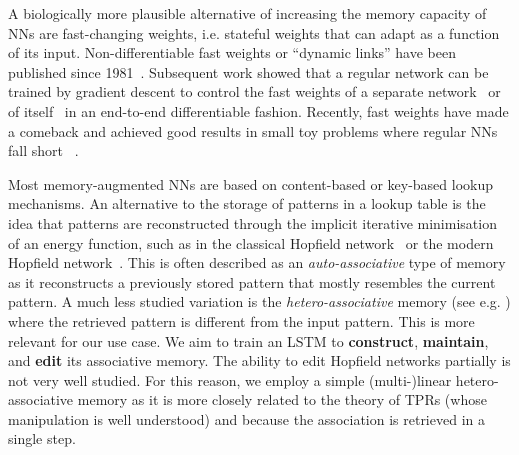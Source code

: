 \documentclass{article} \usepackage{iclr2021_conference,times}
\begin{document}
A biologically more plausible alternative of increasing the memory capacity of NNs are fast-changing weights, i.e. stateful weights that can adapt as a function of its input.
Non-differentiable fast weights or ``dynamic links'' have been published since 1981~\citep{von1981correlation,feldman1982dynamic,hinton1987deblur}.
Subsequent work showed that a regular network can be trained by gradient descent to control the fast weights of a separate network~\citep{Schmidhuber:92ncfastweights} or of itself~\citep{Schmidhuber:93ratioicann} in an end-to-end differentiable fashion.
Recently, fast weights have made a comeback and achieved good results in small toy problems where regular NNs fall short ~\citep{Ba2016using,schlag2017gated,munkhdalai2017meta,pritzel2017neural,ha2017hypernetworks,zhang2017learning,miconi2018differentiable,miconi2018backpropamine,schlag2018nips,munkhdalai2019metalearned,Bartunov2020Meta-Learning}.

Most memory-augmented NNs are based on content-based or key-based lookup mechanisms. 
An alternative to the storage of patterns in a lookup table is the idea that patterns are reconstructed through the implicit iterative minimisation of an energy function, such as in the classical Hopfield network~\citep{steinbuch1961lernmatrix, willshaw1969non, hopfield1982neural, kanerva1988sparse} or the modern Hopfield network~\citep{krotov2016dense, demircigil2017model, ramsauer2020hopfield}.
This is often described as an \textit{auto-associative} type of memory as it reconstructs a previously stored pattern that mostly resembles the current pattern.
A much less studied variation is the \textit{hetero-associative} memory (see e.g. \citet{kosko1988bidirectional}) where the retrieved pattern is different from the input pattern. This is more relevant for our use case. 
We aim to train an LSTM to \textbf{construct}, \textbf{maintain}, and \textbf{edit} its associative memory. 
The ability to edit Hopfield networks partially is not very well studied.
For this reason, we employ a simple (multi-)linear hetero-associative memory as it is more closely related to the theory of TPRs (whose manipulation is well understood) and because the association is retrieved in a single step.
\end{document}
